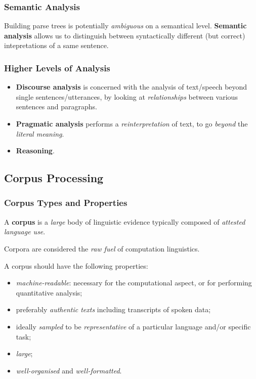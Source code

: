 \subsubsection{Semantic Analysis}
Building parse trees is potentially \emph{ambiguous} on a semantical level.
\textbf{Semantic analysis} allows us to distinguish between syntactically different (but correct) intepretations of a same sentence.

\subsubsection{Higher Levels of Analysis}
\begin{itemize}
	\item \textbf{Discourse analysis} is concerned with the analysis of text/speech beyond single sentences\fshyp{}utterances, by looking at \emph{relationships} between various sentences and paragraphs.
	\item \textbf{Pragmatic analysis} performs a \emph{reinterpretation} of text, to go \emph{beyond} the \emph{literal meaning}.
	\item \textbf{Reasoning}.
\end{itemize}

\subsection{Corpus Processing}
\subsubsection{Corpus Types and Properties}
\begin{mydef}[Corpus]
	A \textbf{corpus} is a \emph{large} body of linguistic evidence typically composed of \emph{attested language use}.
\end{mydef}
Corpora are considered the \emph{raw fuel} of computation linguistics.

A corpus should have the following properties:
\begin{itemize}
	\item \emph{machine-readable}: necessary for the computational aspect, or for performing quantitative analysis;
	\item preferably \emph{authentic texts} including transcripts of spoken data;
	\item ideally \emph{sampled} to be \emph{representative} of a particular language and/or specific task;
	\item \emph{large};
	\item \emph{well-organised} and \emph{well-formatted}.
\end{itemize}

